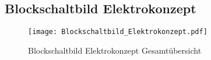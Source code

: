 \documentclass[main.tex]{subfiles} %
\begin{document}
\clearpage

\begin{landscape}
    \section{Blockschaltbild Elektrokonzept} \label{apdx:Blockschaltbild_Elektrokonzept}

    \begin{figure}[H]
        \centering
        \texttt{[image: Blockschaltbild\_Elektrokonzept.pdf]}
        \caption{Blockschaltbild Elektrokonzept Gesamtübersicht} \label{fig:Blockschaltbild_elektro_gesamt}
    \end{figure}
\end{landscape}
\end{document}
